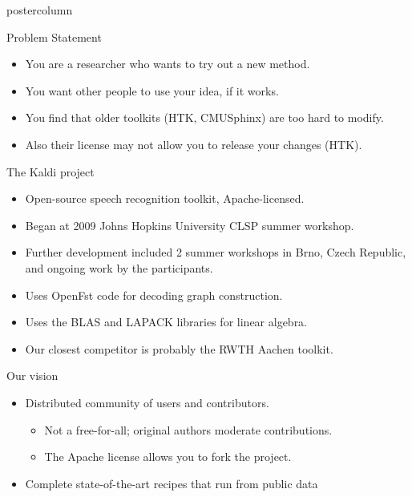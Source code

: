 \documentclass[final,hyperref={pdfpagelabels=false}]{beamer}
\begin{document}
\begin{frame}[fragile]
\begin{columns}
\begin{column}{.33\textwidth}
\begin{beamercolorbox}[center,wd=\textwidth]{postercolumn}
\begin{minipage}[T]{.95\textwidth}
{            \begin{block}{Problem Statement}
              \begin{itemize}
              \item You are a researcher who wants to try out a new method.
              \item You want other people to use your idea, if it works.
              \item You find that older toolkits (HTK, CMUSphinx) are too hard to modify.
              \item Also their license may not allow you to release your changes (HTK).
              \end{itemize}
            \end{block}
            \vfill
            \begin{block}{The Kaldi project}
              \begin{itemize}
              \item Open-source speech recognition toolkit, Apache-licensed.
              \item Began at 2009 Johns Hopkins University CLSP summer workshop.
              \item Further development included 2 summer workshops in Brno, Czech Republic, and ongoing work by the participants.
              \item Uses OpenFst code for decoding graph construction.
              \item Uses the BLAS and LAPACK libraries for linear algebra.
              \item Our closest competitor is probably the RWTH Aachen toolkit.
              \end{itemize}
            \end{block}
            \vfill
            \begin{block}{Our vision}
              \begin{itemize}
              \item Distributed community of users and contributors.
                \begin{itemize}
                \item Not a free-for-all; original authors moderate contributions.
                \item The Apache license allows you to fork the project.
                \end{itemize}
              \item Complete state-of-the-art recipes that run from public data

\end{itemize}
\end{block}}
\end{minipage}
\end{beamercolorbox}
\end{column}
\end{columns}
\end{frame}
\end{document}
